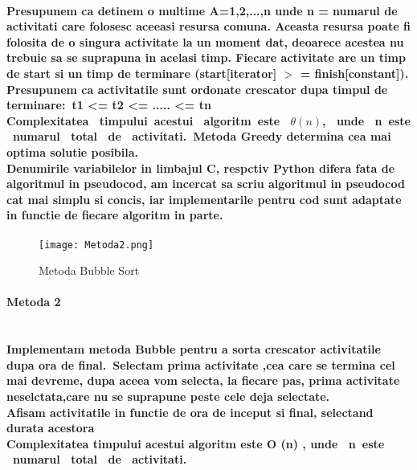 \documentclass[12pt, a4paper,oneside]{article}
\begin{document}
\paragraph{Presupunem ca detinem o multime A=1,2,...,n unde n = numarul de activitati care folosesc aceeasi resursa comuna. Aceasta resursa poate fi folosita de o singura activitate la un moment dat, deoarece acestea nu trebuie sa se suprapuna in acelasi timp. 
Fiecare activitate are un timp de start si un timp de terminare 
(start[iterator] $>$ = finish[constant]). \\
Presupunem ca activitatile sunt ordonate crescator dupa timpul de terminare:\ t1 \textless= t2 \textless= ..... \textless= tn \\
Complexitatea \ timpului\ acestui \ algoritm\ este \ $ \theta (n) $, \ unde \ n\ este \ numarul \ total \ de \ activitati.\ Metoda Greedy determina cea mai optima solutie posibila.\\
Denumirile variabilelor in limbajul C, respctiv Python difera fata de algoritmul in pseudocod, am incercat sa scriu algoritmul in pseudocod cat mai simplu si concis, iar implementarile pentru cod sunt adaptate in functie de fiecare algoritm in parte.
}
\vspace{2em}
\large
\vspace{2em}
\newpage{}
\begin{figure}
\texttt{[image: Metoda2.png]}
\caption{Metoda Bubble Sort}
\end{figure}
\Large
\vspace{2em}
\paragraph{Metoda 2\\\\}
\paragraph{Implementam metoda Bubble pentru a sorta crescator activitatile dupa ora de final.\
Selectam prima activitate ,cea care se termina cel mai devreme, dupa aceea vom selecta, la fiecare pas, prima activitate neselctata,care nu se suprapune peste cele deja selectate. \\
Afisam activitatile in functie de ora de inceput si final, selectand durata acestora\\
Complexitatea timpului acestui algoritm este O (n) , unde \ n\ este \ numarul \ total \ de \ activitati. }
\begin{center}
\huge
{}
\vspace{1em}
\end{center}
\end{document}
